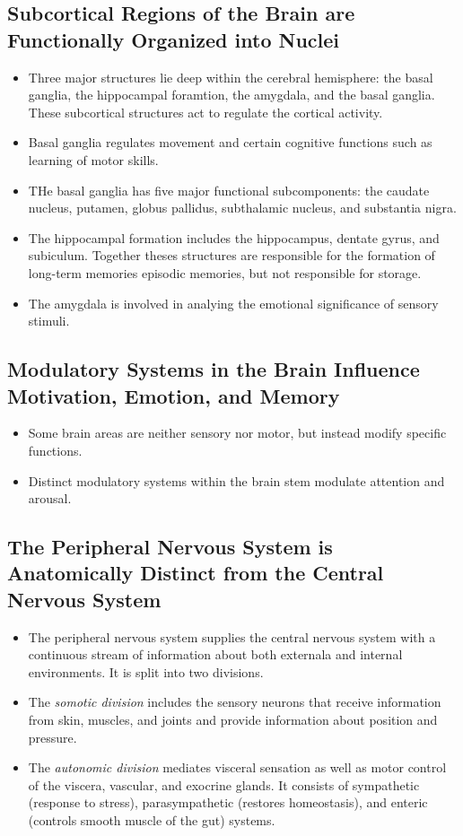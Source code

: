 \documentclass[12pt,a4paper]{article}
\begin{document}
\subsection{Subcortical Regions of the Brain are Functionally Organized into Nuclei}
\begin{itemize}
    \item Three major structures lie deep within the cerebral hemisphere: the basal ganglia, the hippocampal foramtion, the amygdala, and the basal ganglia. These subcortical structures act to regulate the cortical activity. 
    \item Basal ganglia regulates movement and certain cognitive functions such as learning of motor skills.
    \item THe basal ganglia has five major functional subcomponents: the caudate nucleus, putamen, globus pallidus, subthalamic nucleus, and substantia nigra.
    \item The hippocampal formation includes the hippocampus, dentate gyrus, and subiculum. Together theses structures are responsible for the formation of long-term memories episodic memories, but not responsible for storage.
    \item The amygdala is involved in analying the emotional significance of sensory stimuli.
\end{itemize}

\subsection{Modulatory Systems in the Brain Influence Motivation, Emotion, and Memory}
\begin{itemize}
    \item Some brain areas are neither sensory nor motor, but instead modify specific functions.
    \item Distinct modulatory systems within the brain stem modulate attention and arousal. 
\end{itemize}

\subsection{The Peripheral Nervous System is Anatomically Distinct from the Central Nervous System}
\begin{itemize}
    \item The peripheral nervous system supplies the central nervous system with a continuous stream of information about both externala and internal environments. It is split into two divisions.
    \item The \textit{somotic division} includes the sensory neurons that receive information from skin, muscles, and joints and provide information about position and pressure. 
    \item The \textit{autonomic division} mediates visceral sensation as well as motor control of the viscera, vascular, and exocrine glands. It consists of sympathetic (response to stress), parasympathetic (restores homeostasis), and enteric (controls smooth muscle of the gut) systems.
\end{itemize}




\end{document}
